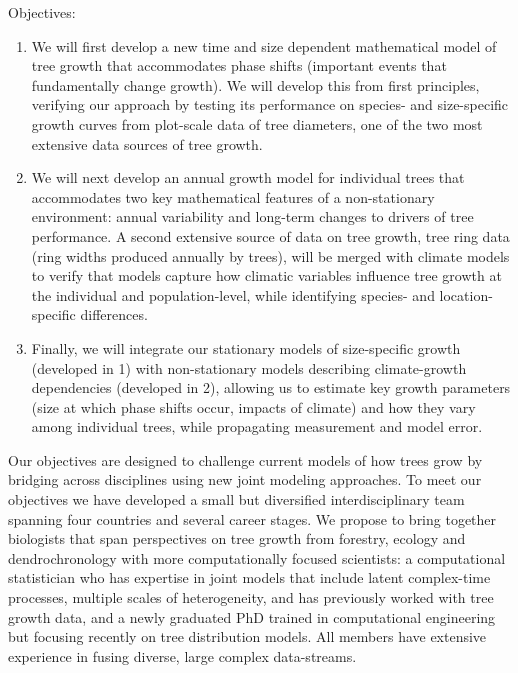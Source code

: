 \documentclass[11pt]{article}
\begin{document}
Objectives: 
\begin{enumerate}
\item We will first develop a new time and size dependent mathematical model of tree growth that accommodates phase shifts (important events that fundamentally change growth). We will develop this from first principles, verifying our approach by testing its performance on species- and size-specific growth curves from plot-scale data of tree diameters, one of the two most extensive data sources of tree growth.
\item We will next develop an annual growth model for individual trees that accommodates two key mathematical features of a non-stationary environment: annual variability and long-term changes to drivers of tree performance. A second extensive source of data on tree growth, tree ring data (ring widths produced annually by trees), will be merged with climate models to verify that models capture how climatic variables influence tree growth at the individual and population-level, while identifying species- and location-specific differences. 
\item Finally, we will integrate our stationary models of size-specific growth (developed in 1) with non-stationary models describing climate-growth dependencies (developed in 2), allowing us to estimate key growth parameters (size at which phase shifts occur, impacts of climate) and how they vary among individual trees, while propagating measurement and model error.  
\end{enumerate}

Our objectives are designed to challenge current models of how trees grow by bridging across disciplines using new joint modeling approaches. To meet our objectives we have developed a small  but diversified interdisciplinary team spanning four countries and several career stages. We propose to bring together biologists that span perspectives on tree growth from forestry, ecology and dendrochronology  with more computationally focused scientists: a computational statistician who has expertise in joint models that include latent complex-time processes, multiple scales of heterogeneity, and has previously worked with tree growth data, and a newly graduated PhD trained in computational engineering but focusing recently on tree distribution models. All members have extensive experience in fusing diverse, large complex data-streams. 
\end{document}
